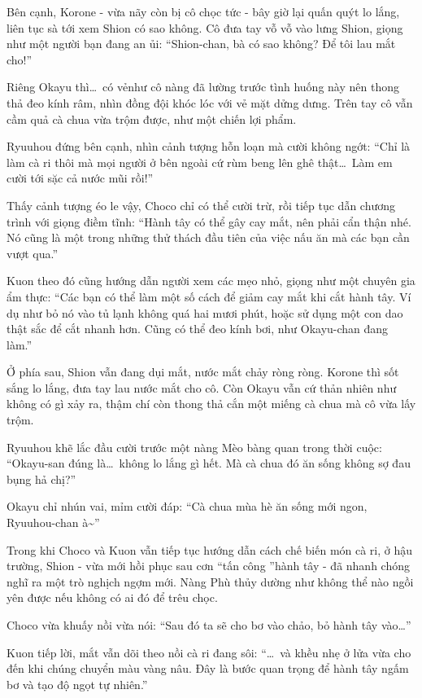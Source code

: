 \documentclass[../main.tex]{subfiles}
\begin{document}
Bên cạnh, Korone - vừa nãy còn bị cô chọc tức - bây giờ lại quấn quýt lo lắng, liên tục sà tới xem Shion có sao không. Cô đưa tay vỗ vỗ vào lưng Shion, giọng như một người bạn đang an ủi: ``Shion-chan, bà có sao không? Để tôi lau mắt cho!''

Riêng Okayu thì\dots\ có vẻnhư cô nàng đã lường trước tình huống này nên thong thả đeo kính râm, nhìn đồng đội khóc lóc với vẻ mặt dửng dưng. Trên tay cô vẫn cầm quả cà chua vừa trộm được, như một chiến lợi phẩm.

Ryuuhou đứng bên cạnh, nhìn cảnh tượng hỗn loạn mà cười không ngớt: ``Chỉ là làm cà ri thôi mà mọi người ở bên ngoài cứ rùm beng lên ghê thật\dots\ Làm em cười tới sặc cả nước mũi rồi!''

Thấy cảnh tượng éo le vậy, Choco chỉ có thể cười trừ, rồi tiếp tục dẫn chương trình với giọng điềm tĩnh: ``Hành tây có thể gây cay mắt, nên phải cẩn thận nhé. Nó cũng là một trong những thử thách đầu tiên của việc nấu ăn mà các bạn cần vượt qua.''

Kuon theo đó cũng hướng dẫn người xem các mẹo nhỏ, giọng như một chuyên gia ẩm thực: ``Các bạn có thể làm một số cách để giảm cay mắt khi cắt hành tây. Ví dụ như bỏ nó vào tủ lạnh không quá hai mươi phút, hoặc sử dụng một con dao thật sắc để cắt nhanh hơn. Cũng có thể đeo kính bơi, như Okayu-chan đang làm.''

Ở phía sau, Shion vẫn đang dụi mắt, nước mắt chảy ròng ròng. Korone thì sốt sắng lo lắng, đưa tay lau nước mắt cho cô. Còn Okayu vẫn cứ thản nhiên như không có gì xảy ra, thậm chí còn thong thả cắn một miếng cà chua mà cô vừa lấy trộm.

Ryuuhou khẽ lắc đầu cười trước một nàng Mèo bàng quan trong thời cuộc: ``Okayu-san đúng là\dots\ không lo lắng gì hết. Mà cà chua đó ăn sống không sợ đau bụng hả chị?''

Okayu chỉ nhún vai, mỉm cười đáp: ``Cà chua mùa hè ăn sống mới ngon, Ryuuhou-chan à\~{}''

\ct

Trong khi Choco và Kuon vẫn tiếp tục hướng dẫn cách chế biến món cà ri, ở hậu trường, Shion - vừa mới hồi phục sau cơn ``tấn công ''hành tây - đã nhanh chóng nghĩ ra một trò nghịch ngợm mới. Nàng Phù thủy dường như không thể nào ngồi yên được nếu không có ai đó để trêu chọc.

Choco vừa khuấy nồi vừa nói: ``Sau đó ta sẽ cho bơ vào chảo, bỏ hành tây vào\dots''

Kuon tiếp lời, mắt vẫn dõi theo nồi cà ri đang sôi: ``\dots\ và khều nhẹ ở lửa vừa cho đến khi chúng chuyển màu vàng nâu. Đây là bước quan trọng để hành tây ngấm bơ và tạo độ ngọt tự nhiên.''
\end{document}
